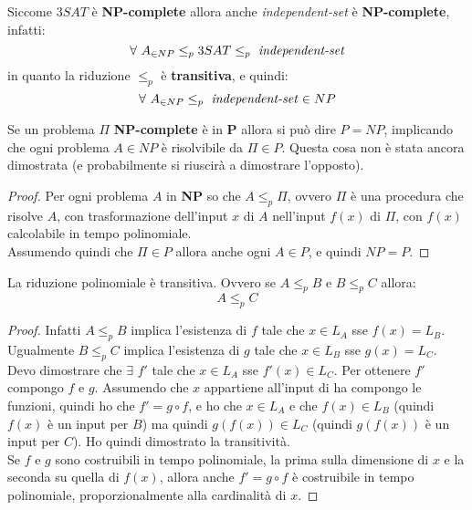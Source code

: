 								Siccome $3SAT$ è \textbf{NP-complete} allora anche \textit{independent-set} è
								\textbf{NP-complete}, infatti:
								\[\forall\,\, A_{\in NP}\leq_p 3SAT\leq_p \mbox{ \textit{independent-set}}\]
								in quanto la riduzione $\leq_p$ è \textbf{transitiva}, e quindi:
								\[\forall\,\, A_{\in NP}\leq_p \mbox{ \textit{independent-set}}\in NP\]
								\begin{teorema}
									Se un problema $\Pi$ \textbf{NP-complete} è in \textbf{P} allora si può dire
									$P=NP$, implicando che ogni problema $A\in NP$ è risolvibile da $\Pi\in P$.
									Questa cosa non è stata ancora dimostrata (e probabilmente si riuscirà
									a dimostrare l'opposto).
								\end{teorema}
								\begin{proof}
									Per ogni problema $A$ in \textbf{NP} so che $A\leq_p \Pi$, ovvero $\Pi$ è una
									procedura che risolve $A$, con trasformazione dell'input $x$ di $A$ nell'input
									$f(x)$ di $\Pi$, con $f(x)$ calcolabile in tempo polinomiale.\\
									Assumendo quindi che $\Pi\in P$ allora anche ogni $A\in P$, e quindi $NP=P$.
								\end{proof}
								\begin{teorema}
									La riduzione polinomiale è transitiva. Ovvero se $A\leq_p B$ e $B\leq_p C$
									allora:
									\[A\leq_p C\]
								\end{teorema}
								\begin{proof}
									Infatti $A\leq_p B$ implica l'esistenza di $f$ tale che $x\in L_A$ sse
									$f(x)=L_B$. Ugualmente $B\leq_p C$ implica l'esistenza di $g$ tale che $x\in
									L_B$ sse $g(x)=L_C$.\\
									Devo dimostrare che $\exists\,\,f'$ tale che $x\in L_A$ sse $f'(x)\in
									L_C$. Per ottenere $f'$ compongo $f$ e $g$. Assumendo che $x$ appartiene
									all'input di ha compongo le funzioni, quindi ho che $f'=g\circ f$,
									e ho che $x\in L_A$ e che $f(x)\in L_B$ (quindi $f(x)$ è un input per $B$) ma
									quindi $g(f(x))\in L_C$ (quindi $g(f(x))$ è un input per $C$). Ho quindi
									dimostrato la transitività.\\
									Se $f$ e $g$ sono costruibili in tempo polinomiale, la prima sulla dimensione
									di $x$ e la seconda su quella di $f(x)$, allora anche $f'=g\circ f$
									è costruibile in tempo polinomiale, proporzionalmente alla cardinalità di $x$.
								\end{proof}
